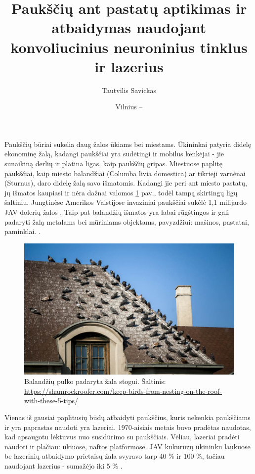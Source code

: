 \documentclass{VUMIFPSkursinis}
\title{Paukščių ant pastatų aptikimas ir atbaidymas naudojant konvoliucinius neuroninius tinklus ir lazerius}
\author{Tautvilis Savickas}
\date{Vilnius – \the\year}
\begin{document}
\maketitle

\tableofcontents


Paukščių būriai sukelia daug žalos ūkiams bei miestams. Ūkininkai patyria didelę ekonominę žalą, kadangi paukščiai yra sudėtingi ir  mobilus kenkėjai - jie sunaikiną derlių \cite{refId0} ir platina ligas, kaip paukščių gripas. Miestuose paplitę paukščiai, kaip miesto balandžiai (Columba livia domestica) ar tikrieji varnėnai (Sturnus), daro didelę žalą savo išmatomis. Kadangi jie peri ant miesto pastatų, jų išmatos kaupiasi ir nėra dažnai valomos \ref{img:bird_poop} pav., todėl tampą skirtingų ligų šaltiniu. Jungtinėse Amerikos Valstijose invaziniai paukščiai sukėlė 1,1 milijardo JAV dolerių žalos \cite{article}. Taip pat balandžių išmatos yra labai rūgštingos ir gali padaryti žalą metalams bei mūriniams objektams, pavyzdžiui: mašinos, pastatai, paminklai. \cite{ahmed2021effect, shrestha2022conservation}.

\begin{figure}[H]
    \centering
    \includegraphics[scale=0.5]{img/bird_poop_on_roof.png}
    \caption{Balandžių pulko padaryta žala stogui. Šaltinis: \href{https://shamrockroofer.com/keep-birds-from-nesting-on-the-roof-with-these-5-tips/}{https://shamrockroofer.com/keep-birds-from-nesting-on-the-roof-with-these-5-tips/}}
    \label{img:bird_poop}
\end{figure}


Vienas iš gausiai paplitusių būdų atbaidyti paukščius, kuris nekenkia paukščiams ir yra paprastas naudoti yra lazeriai. 1970-aisiais metais buvo pradėtas naudotas, kad apsaugotu lėktuvus nuo susidūrimo su paukščiais. Vėliau, lazeriai pradėti naudoti ir plačiau: ūkiuose, naftos platformose. JAV kukurūzų ūkininku laukuose be lazerinių atbaidymo prietaisų žala svyravo tarp 40 \% ir 100 \%, tačiau naudojant lazerius - sumažėjo iki 5 \% \cite{brown2017laser}.
\end{document}
